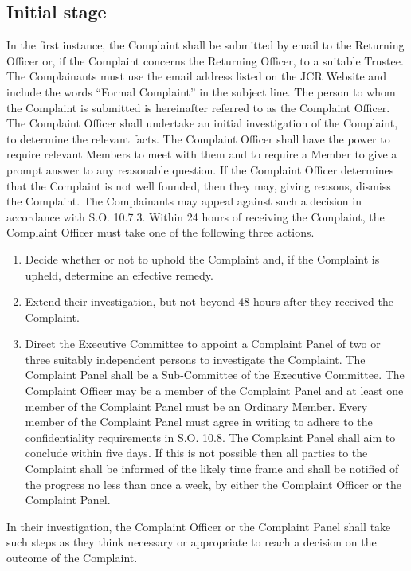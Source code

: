 \subsection{Initial stage}
\npara In the first instance, the Complaint shall be submitted by email to the Returning Officer or, if the Complaint concerns the Returning Officer, to a suitable Trustee.  The Complainants must use the email address listed on the JCR Website and include the words ``Formal Complaint'' in the subject line.  The person to whom the Complaint is submitted is hereinafter referred to as the Complaint Officer.
\npara The Complaint Officer shall undertake an initial investigation of the Complaint, to determine the relevant facts.  The Complaint Officer shall have the power to require relevant Members to meet with them and to require a Member to give a prompt answer to any reasonable question.
\npara If the Complaint Officer determines that the Complaint is not well founded, then they may, giving reasons, dismiss the Complaint.  The Complainants may appeal against such a decision in accordance with S.O. 10.7.3.
\npara Within 24 hours of receiving the Complaint, the Complaint Officer must take one of the following three actions.
\begin{enumerate}
\item Decide whether or not to uphold the Complaint and, if the Complaint is upheld, determine an effective remedy.
\item Extend their investigation, but not beyond 48 hours after they received the Complaint.
\item Direct the Executive Committee to appoint a Complaint Panel of two or three suitably independent persons to investigate the Complaint.  The Complaint Panel shall be a Sub-Committee of the Executive Committee.  The Complaint Officer may be a member of the Complaint Panel and at least one member of the Complaint Panel must be an Ordinary Member.  Every member of the Complaint Panel must agree in writing to adhere to the confidentiality requirements in S.O. 10.8.  The Complaint Panel shall aim to conclude within five days.  If this is not possible then all parties to the Complaint shall be informed of the likely time frame and shall be notified of the progress no less than once a week, by either the Complaint Officer or the Complaint Panel.
\end{enumerate}
\npara In their investigation, the Complaint Officer or the Complaint Panel shall take such steps as they think necessary or appropriate to reach a decision on the outcome of the Complaint.
